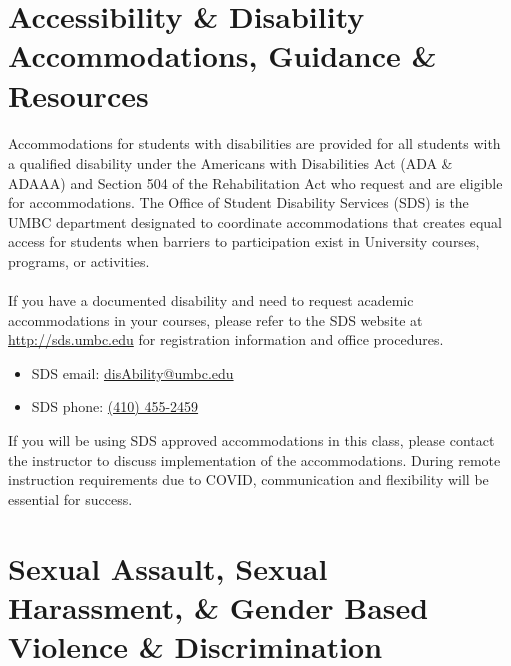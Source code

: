 \documentclass[letter,11pt]{article}
\begin{document}
\section*{Accessibility \& Disability Accommodations, Guidance \& Resources}
\paragraph{}Accommodations for students with disabilities are provided for all students with a qualified disability under the Americans with Disabilities Act (ADA \& ADAAA) and Section 504 of the Rehabilitation Act who request and are eligible for accommodations. The Office of Student Disability Services (SDS) is the UMBC department designated to coordinate accommodations that creates equal access for students when barriers to participation exist in University courses, programs, or activities.

\paragraph{}If you have a documented disability and need to request academic accommodations in your courses, please refer to the SDS website at \url{http://sds.umbc.edu} for registration information and office procedures.
\begin{itemize}
\item SDS email: \href{mailto:disAbility@umbc.edu}{disAbility@umbc.edu}
\item SDS phone: \href{tel:+14104552459}{(410) 455-2459}
\end{itemize}
If you will be using SDS approved accommodations in this class, please contact the instructor to discuss implementation of the accommodations. During remote instruction requirements due to COVID, communication and flexibility will be essential for success.

\section*{Sexual Assault, Sexual Harassment, \& Gender Based Violence \& Discrimination}
\end{document}
